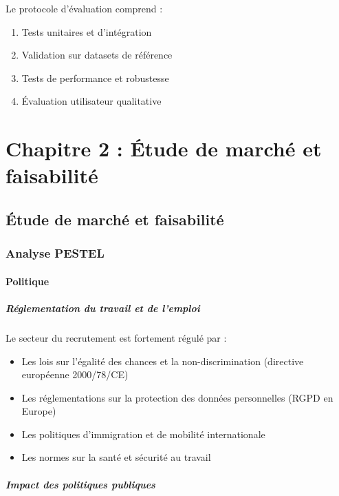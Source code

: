 \documentclass[12pt,a4paper]{report}
\begin{document}
Le protocole d'évaluation comprend :
\begin{enumerate}
\item Tests unitaires et d'intégration
\item Validation sur datasets de référence
\item Tests de performance et robustesse
\item Évaluation utilisateur qualitative
\end{enumerate}

\part{Chapitre 2 : Étude de marché et faisabilité}
\label{part:marche}
\chapter{Étude de marché et faisabilité}
\label{chap:marche}

\section{Analyse PESTEL}

\subsection{Politique}

\subsubsection{Réglementation du travail et de l'emploi}

Le secteur du recrutement est fortement régulé par :
\begin{itemize}
\item Les lois sur l'égalité des chances et la non-discrimination (directive européenne 2000/78/CE)
\item Les réglementations sur la protection des données personnelles (RGPD en Europe)
\item Les politiques d'immigration et de mobilité internationale
\item Les normes sur la santé et sécurité au travail
\end{itemize}

\subsubsection{Impact des politiques publiques}
\end{document}
